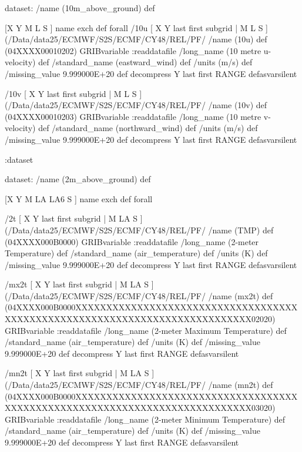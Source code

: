 \begin{ingrid}

dataset:
/name (10m_above_ground) def

[X Y M L S ] {name exch def } forall
/10u { [ X Y last first subgrid | M L S ] (/Data/data25/ECMWF/S2S/ECMF/CY48/REL/PF/%
/name (10u) def
(04XXXX00010202) GRIBvariable
:readdatafile
/long_name (10 metre u-velocity) def
/standard_name (eastward_wind) def
/units (m/s) def
/missing_value 9.999000E+20 def
decompress
Y last first RANGE
} defasvarsilent

/10v { [ X Y last first subgrid | M L S ] (/Data/data25/ECMWF/S2S/ECMF/CY48/REL/PF/%
/name (10v) def
(04XXXX00010203) GRIBvariable
:readdatafile
/long_name (10 metre v-velocity) def
/standard_name (northward_wind) def
/units (m/s) def
/missing_value 9.999000E+20 def
decompress
Y last first RANGE
} defasvarsilent

:dataset

dataset:
/name (2m_above_ground) def

[X Y M LA LA6 S ] {name exch def } forall


/2t { [ X Y last first subgrid | M LA S ] (/Data/data25/ECMWF/S2S/ECMF/CY48/REL/PF/%
/name (TMP) def
(04XXXX000B0000) GRIBvariable
:readdatafile
/long_name (2-meter Temperature) def
/standard_name (air_temperature) def
/units (K) def
/missing_value 9.999000E+20 def
decompress
Y last first RANGE
} defasvarsilent


/mx2t { [ X Y last first subgrid | M LA S ] (/Data/data25/ECMWF/S2S/ECMF/CY48/REL/PF/%
/name (mx2t) def
(04XXXX000B0000XXXXXXXXXXXXXXXXXXXXXXXXXXXXXXXXXXXXXXXXXXXXXXXXXXXXXXXXXXXXXXXXXXXXXXXXXXXX02020) GRIBvariable
:readdatafile
/long_name (2-meter Maximum Temperature) def
/standard_name (air_temperature) def
/units (K) def
/missing_value 9.999000E+20 def
decompress
Y last first RANGE
} defasvarsilent

/mn2t { [ X Y last first subgrid | M LA S ] (/Data/data25/ECMWF/S2S/ECMF/CY48/REL/PF/%
/name (mn2t) def
(04XXXX000B0000XXXXXXXXXXXXXXXXXXXXXXXXXXXXXXXXXXXXXXXXXXXXXXXXXXXXXXXXXXXXXXXXXXXXXXXXXXXX03020) GRIBvariable
:readdatafile
/long_name (2-meter Minimum Temperature) def
/standard_name (air_temperature) def
/units (K) def
/missing_value 9.999000E+20 def
decompress
Y last first RANGE
} defasvarsilent



\end{ingrid}

